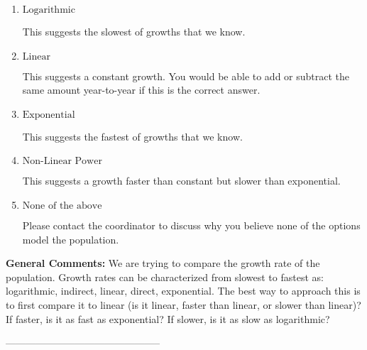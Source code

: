 \documentclass{extbook}[14pt]
\begin{document}
\begin{enumerate}[label=\Alph*.] 
\item $ \text{Logarithmic} $ 

 This suggests the slowest of growths that we know. 
\item $ \text{Linear} $ 

 This suggests a constant growth. You would be able to add or subtract the same amount year-to-year if this is the correct answer. 
\item $ \text{Exponential} $ 

 This suggests the fastest of growths that we know. 
\item $ \text{Non-Linear Power} $ 

 This suggests a growth faster than constant but slower than exponential. 
\item $ \text{None of the above} $ 

 Please contact the coordinator to discuss why you believe none of the options model the population. 
\end{enumerate} 
 
\textbf{General Comments:} We are trying to compare the growth rate of the population. Growth rates can be characterized from slowest to fastest as: logarithmic, indirect, linear, direct, exponential. The best way to approach this is to first compare it to linear (is it linear, faster than linear, or slower than linear)? If faster, is it as fast as exponential? If slower, is it as slow as logarithmic?

-----------------------------------------------
\end{document}
